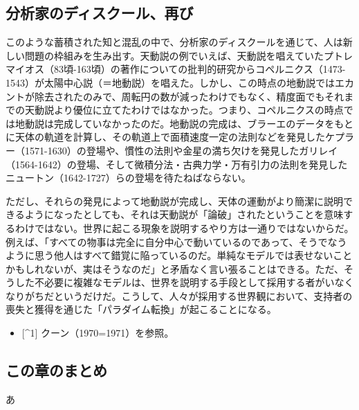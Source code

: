 \subsection{分析家のディスクール、再び}\label{ux5206ux6790ux5bb6ux306eux30c7ux30a3ux30b9ux30afux30fcux30ebux518dux3073}

このような蓄積された知と混乱の中で、分析家のディスクールを通じて、人は新しい問題の枠組みを生み出す。天動説の例でいえば、天動説を唱えていたプトレマイオス（83頃-163頃）の著作についての批判的研究からコペルニクス（1473-1543）が太陽中心説（＝地動説）を唱えた。しかし、この時点の地動説ではエカントが除去されたのみで、周転円の数が減ったわけでもなく、精度面でもそれまでの天動説より優位に立てたわけではなかった。つまり、コペルニクスの時点では地動説は完成していなかったのだ。地動説の完成は、ブラーエのデータをもとに天体の軌道を計算し、その軌道上で面積速度一定の法則などを発見したケプラー（1571-1630）の登場や、慣性の法則や金星の満ち欠けを発見したガリレイ（1564-1642）の登場、そして微積分法・古典力学・万有引力の法則を発見したニュートン（1642-1727）らの登場を待たねばならない。

ただし、それらの発見によって地動説が完成し、天体の運動がより簡潔に説明できるようになったとしても、それは天動説が「論破」されたということを意味するわけではない。世界に起こる現象を説明するやり方は一通りではないからだ。例えば、「すべての物事は完全に自分中心で動いているのであって、そうでなうように思う他人はすべて錯覚に陥っているのだ。単純なモデルでは表せないことかもしれないが、実はそうなのだ」と矛盾なく言い張ることはできる。ただ、そうした不必要に複雑なモデルは、世界を説明する手段として採用する者がいなくなりがちだというだけだ。こうして、人々が採用する世界観において、支持者の喪失と獲得を通じた「パラダイム転換」が起こることになる。

\begin{itemize}
\tightlist
\item
  {[}\^{}1{]} クーン（1970=1971）を参照。
\end{itemize}

\subsection{この章のまとめ}\label{ux3053ux306eux7ae0ux306eux307eux3068ux3081}

あ
